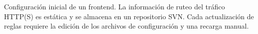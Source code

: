 \label{fig:feinicial}
Configuración inicial de un frontend. La información de ruteo del
tráfico HTTP(S) es estática y se almacena en un repositorio SVN. Cada
actualización de reglas requiere la edición de los archivos de
configuración y una recarga manual.
